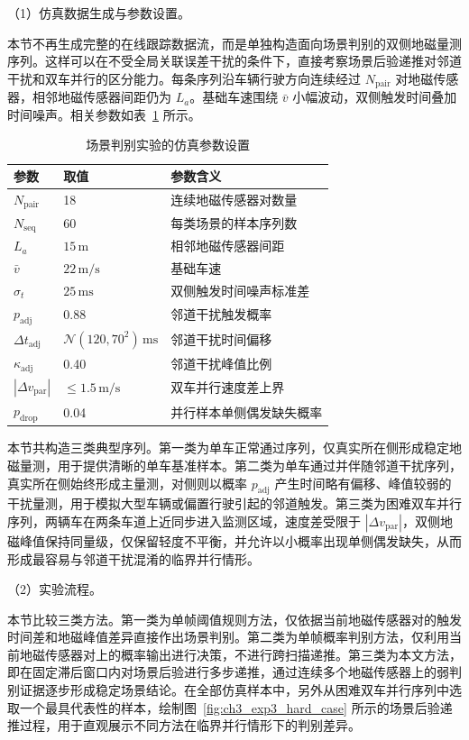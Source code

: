 \documentclass{xdupgthesis}
\begin{document}
\noindent （1）仿真数据生成与参数设置。

本节不再生成完整的在线跟踪数据流，而是单独构造面向场景判别的双侧地磁量测序列。这样可以在不受全局关联误差干扰的条件下，直接考察场景后验递推对邻道干扰和双车并行的区分能力。每条序列沿车辆行驶方向连续经过 $N_{\mathrm{pair}}$ 对地磁传感器，相邻地磁传感器间距仍为 $L_a$。基础车速围绕 $\bar v$ 小幅波动，双侧触发时间叠加时间噪声。相关参数如表~\ref{tab:ch3_scene_discrim_sim} 所示。

\begin{table}[H]
	\centering
	\caption{场景判别实验的仿真参数设置}
	\label{tab:ch3_scene_discrim_sim}
	\small
	\begin{tabular}{p{2.8cm}p{3.0cm}p{6.0cm}}
		\toprule
		参数 & 取值 & 参数含义 \\
		\midrule
		$N_{\mathrm{pair}}$ & 18 & 连续地磁传感器对数量 \\
		$N_{\mathrm{seq}}$ & 60 & 每类场景的样本序列数 \\
		$L_a$ & $15\,\mathrm{m}$ & 相邻地磁传感器间距 \\
		$\bar v$ & $22\,\mathrm{m/s}$ & 基础车速 \\
		$\sigma_t$ & $25\,\mathrm{ms}$ & 双侧触发时间噪声标准差 \\
		$p_{\mathrm{adj}}$ & 0.88 & 邻道干扰触发概率 \\
		$\Delta t_{\mathrm{adj}}$ & $\mathcal N(120,70^2)\,\mathrm{ms}$ & 邻道干扰时间偏移 \\
		$\kappa_{\mathrm{adj}}$ & 0.40 & 邻道干扰峰值比例 \\
		$|\Delta v_{\mathrm{par}}|$ & $\leq 1.5\,\mathrm{m/s}$ & 双车并行速度差上界 \\
		$p_{\mathrm{drop}}$ & 0.04 & 并行样本单侧偶发缺失概率 \\
		\bottomrule
	\end{tabular}
\end{table}

本节共构造三类典型序列。第一类为单车正常通过序列，仅真实所在侧形成稳定地磁量测，用于提供清晰的单车基准样本。第二类为单车通过并伴随邻道干扰序列，真实所在侧始终形成主量测，对侧则以概率 $p_{\mathrm{adj}}$ 产生时间略有偏移、峰值较弱的干扰量测，用于模拟大型车辆或偏置行驶引起的邻道触发。第三类为困难双车并行序列，两辆车在两条车道上近同步进入监测区域，速度差受限于 $|\Delta v_{\mathrm{par}}|$，双侧地磁峰值保持同量级，仅保留轻度不平衡，并允许以小概率出现单侧偶发缺失，从而形成最容易与邻道干扰混淆的临界并行情形。

\noindent （2）实验流程。

本节比较三类方法。第一类为单帧阈值规则方法，仅依据当前地磁传感器对的触发时间差和地磁峰值差异直接作出场景判别。第二类为单帧概率判别方法，仅利用当前地磁传感器对上的概率输出进行决策，不进行跨扫描递推。第三类为本文方法，即在固定滞后窗口内对场景后验进行多步递推，通过连续多个地磁传感器上的弱判别证据逐步形成稳定场景结论。在全部仿真样本中，另外从困难双车并行序列中选取一个最具代表性的样本，绘制图~\ref{fig:ch3_exp3_hard_case} 所示的场景后验递推过程，用于直观展示不同方法在临界并行情形下的判别差异。
\end{document}

